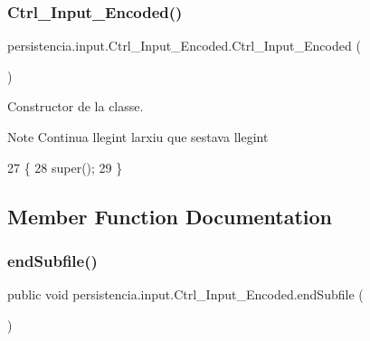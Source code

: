 \subsubsection{\texorpdfstring{Ctrl\+\_\+\+Input\+\_\+\+Encoded()}{Ctrl\_Input\_Encoded()}\hspace{0.1cm}{\footnotesize\ttfamily [2/2]}}
{\footnotesize\ttfamily persistencia.\+input.\+Ctrl\+\_\+\+Input\+\_\+\+Encoded.\+Ctrl\+\_\+\+Input\+\_\+\+Encoded (\begin{DoxyParamCaption}{ }\end{DoxyParamCaption})\hspace{0.3cm}{\ttfamily [inline]}}



Constructor de la classe. 

\begin{DoxyNote}{Note}
Continua llegint l\textquotesingle{}arxiu que s\textquotesingle{}estava llegint 
\end{DoxyNote}

\begin{DoxyCode}
27                                 \{
28         super();
29     \}
\end{DoxyCode}


\subsection{Member Function Documentation}
\mbox{\label{classpersistencia_1_1input_1_1Ctrl__Input__Encoded_a180970a90ac6d386472e5959f7cf3f9b}} 
\subsubsection{\texorpdfstring{end\+Subfile()}{endSubfile()}}
{\footnotesize\ttfamily public void persistencia.\+input.\+Ctrl\+\_\+\+Input\+\_\+\+Encoded.\+end\+Subfile (\begin{DoxyParamCaption}{ }\end{DoxyParamCaption})\hspace{0.3cm}{\ttfamily [inline]}}



